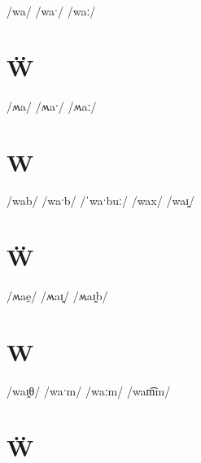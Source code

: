 \documentclass[10pt,a4paper,twoside]{book}
\begin{document}
\begin{multicols}{3}
 {/wa/} {}
 {/waˑ/} {}
 {/waː/} {}
\end{multicols}

\section*{Ẅ}

\begin{multicols}{3}
 {/ʍa/} {}
 {/ʍaˑ/} {}
 {/ʍaː/} {}
\end{multicols}

\section*{W}

\begin{multicols}{3}
 {/wab/} {}
 {/waˑb/} {}
 {/ˈwaˑbuː/} {}
 {/wax/} {}
 {/waɪ̯/} {}
\end{multicols}

\section*{Ẅ}

\begin{multicols}{3}
 {/ʍae̯/} {}
 {/ʍaɪ̯/} {}
 {/ʍaɪ̯b/} {}
\end{multicols}

\section*{W}

\begin{multicols}{3}
 {/waɪ̯θ/} {}
 {/waˑm/} {}
 {/waːm/} {}
 {/wam͡m/} {}
\end{multicols}

\section*{Ẅ}
\end{document}
